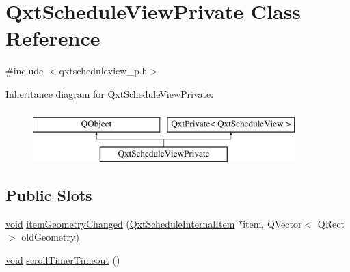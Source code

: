\hypertarget{class_qxt_schedule_view_private}{\section{Qxt\-Schedule\-View\-Private Class Reference}
\label{class_qxt_schedule_view_private}
}


{\ttfamily \#include $<$qxtscheduleview\-\_\-p.\-h$>$}

Inheritance diagram for Qxt\-Schedule\-View\-Private\-:\begin{figure}[H]
\begin{center}
\leavevmode
\includegraphics[height=2.000000cm]{class_qxt_schedule_view_private}
\end{center}
\end{figure}
\subsection*{Public Slots}
\begin{DoxyCompactItemize}
\item 
\hyperlink{group___u_a_v_objects_plugin_ga444cf2ff3f0ecbe028adce838d373f5c}{void} \hyperlink{class_qxt_schedule_view_private_a64200c287a7db519bf4bff0a156bf253}{item\-Geometry\-Changed} (\hyperlink{class_qxt_schedule_internal_item}{Qxt\-Schedule\-Internal\-Item} $\ast$item, Q\-Vector$<$ Q\-Rect $>$ old\-Geometry)
\item 
\hyperlink{group___u_a_v_objects_plugin_ga444cf2ff3f0ecbe028adce838d373f5c}{void} \hyperlink{class_qxt_schedule_view_private_ac914af0957ce5a15af07c157775d94c3}{scroll\-Timer\-Timeout} ()
\end{DoxyCompactItemize}
